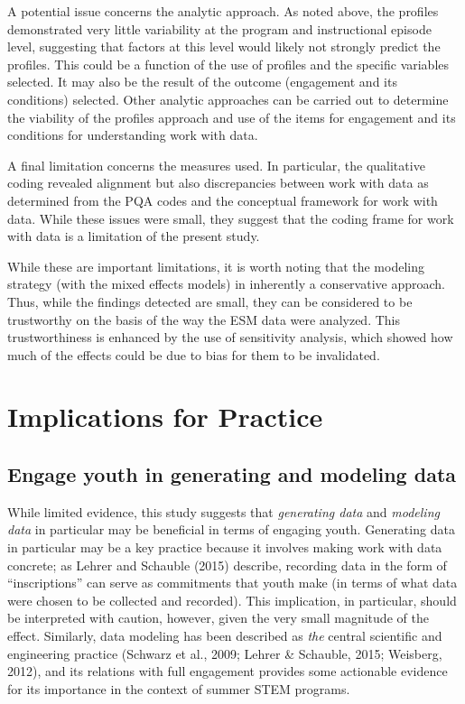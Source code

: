 \documentclass[]{book}
\theoremstyle{definition}
\theoremstyle{definition}
\theoremstyle{definition}
\theoremstyle{remark}
\begin{document}
A potential issue concerns the analytic approach. As noted above, the
profiles demonstrated very little variability at the program and
instructional episode level, suggesting that factors at this level would
likely not strongly predict the profiles. This could be a function of
the use of profiles and the specific variables selected. It may also be
the result of the outcome (engagement and its conditions) selected.
Other analytic approaches can be carried out to determine the viability
of the profiles approach and use of the items for engagement and its
conditions for understanding work with data.

A final limitation concerns the measures used. In particular, the
qualitative coding revealed alignment but also discrepancies between
work with data as determined from the PQA codes and the conceptual
framework for work with data. While these issues were small, they
suggest that the coding frame for work with data is a limitation of the
present study.

While these are important limitations, it is worth noting that the
modeling strategy (with the mixed effects models) in inherently a
conservative approach. Thus, while the findings detected are small, they
can be considered to be trustworthy on the basis of the way the ESM data
were analyzed. This trustworthiness is enhanced by the use of
sensitivity analysis, which showed how much of the effects could be due
to bias for them to be invalidated.

\section{Implications for Practice}\label{implications-for-practice}

\subsection{Engage youth in generating and modeling
data}\label{engage-youth-in-generating-and-modeling-data}

While limited evidence, this study suggests that \emph{generating data}
and \emph{modeling data} in particular may be beneficial in terms of
engaging youth. Generating data in particular may be a key practice
because it involves making work with data concrete; as Lehrer and
Schauble (2015) describe, recording data in the form of ``inscriptions''
can serve as commitments that youth make (in terms of what data were
chosen to be collected and recorded). This implication, in particular,
should be interpreted with caution, however, given the very small
magnitude of the effect. Similarly, data modeling has been described as
\emph{the} central scientific and engineering practice (Schwarz et al.,
2009; Lehrer \& Schauble, 2015; Weisberg, 2012), and its relations with
full engagement provides some actionable evidence for its importance in
the context of summer STEM programs.
\end{document}
